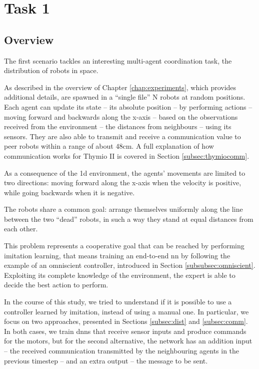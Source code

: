 \section{Task 1}
\label{sec:task1}

\subsection{Overview}
\label{subsec:desc1}

The first scenario tackles an interesting multi-agent coordination task, the 
distribution of robots in space.

As described in the overview of Chapter \ref{chap:experiments}, which provides 
additional details, are spawned in a ``single file'' N robots at random positions.
Each agent can update its state – its absolute position – by performing actions – 
moving forward and backwards along the x-axis – based on the observations 
received from the environment – the distances from neighbours – using its 
sensors. They are also able to transmit and receive a communication value to 
peer robots within a range of about $48$\gls{cm}. 
A full explanation of how communication works for Thymio II is covered in 
Section \ref{subsec:thymiocomm}.

As a consequence of the \gls{1d} environment, the agents' movements are 
limited to two directions: moving forward along the x-axis when the velocity is 
positive, while going backwards when it is negative. 

The robots share a common goal: arrange themselves uniformly along the 
line between the two ``dead'' robots, in such a way they stand at equal distances 
from each other.

This problem represents a cooperative goal that can be reached by performing 
imitation learning, that means training an end-to-end \gls{nn} by following 
the example of an omniscient controller, introduced in Section 
\ref{subsubsec:omniscient}.
Exploiting its complete knowledge of the environment, the expert is able to 
decide the best action to perform.

In the course of this study, we tried to understand if it is possible to use a 
controller learned by imitation, instead of using a manual one. In particular, we 
focus on two approaches, presented in Sections \ref{subsec:dist} and 
\ref{subsec:comm}.
In both cases, we train \glspl{dnn} that receive sensor inputs and produce 
commands for the motors, but for the second alternative, the network has an 
addition input – the received communication transmitted by the neighbouring 
agents in the previous timestep – and an extra output – the message to be sent.

